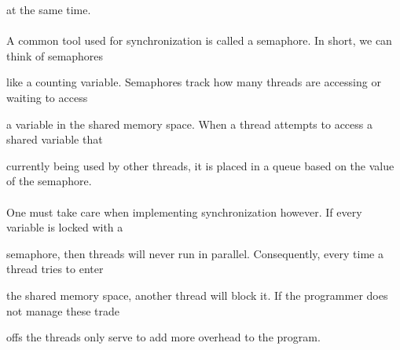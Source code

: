 at the same time. 


\paragraph{}
A common tool used for synchronization is called a semaphore. In short, we can think of semaphores

like a counting variable. Semaphores track how many threads are accessing or waiting to access

a variable in the shared memory space. When a thread attempts to access a shared variable that

currently being used by other threads, it is placed in a queue based on the value of the semaphore.


\paragraph{}
One must take care when implementing synchronization however. If every variable is locked with a 

semaphore, then threads will never run in parallel. Consequently, every time a thread tries to enter 

the shared memory space, another thread will block it. If the programmer does not manage these trade 

offs the threads only serve to add more overhead to the program.
